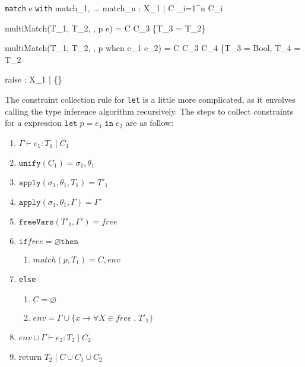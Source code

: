 \documentclass{article}
\begin{document}
    {\Gamma \vdash \texttt{match} \; e \; \texttt{with} \; match_1, ... \; match_n : X_1 \; | \; C \cup \displaystyle \bigcup_{i=1}^{n} C_i}

  {multiMatch(T_1, T_2, \Gamma, p \rightarrow e) = C \cup C_3 \cup \{T_3 = T_2\}}

  {multiMatch(T_1, T_2, \Gamma, p \; \mbox{when} \; e_1 \rightarrow e_2) = C \cup C_3 \cup C_4 \cup \{T_3 = Bool, T_4 = T_2}

    {\Gamma \vdash raise : X_1 \; | \; \{\}}

The constraint collection rule for \texttt{let} is a little more complicated, as it envolves calling the type inference algorithm recursively.
The steps to collect constraints for a expression $\texttt{let} \; p = e_1 \; \texttt{in} \; e_2$ are as follow:

\begin{enumerate}
  \item $\Gamma \vdash e_1 : T_1 \; | \; C_1$

  \item $\texttt{unify}(C_1) = \sigma_1, \theta_1$

  \item $\texttt{apply}(\sigma_1, \theta_1, T_1) = T'_1$

  \item $\texttt{apply}(\sigma_1, \theta_1, \Gamma) = \Gamma'$

  \item $\texttt{freeVars}(T'_1, \Gamma') = free$

  \item $\texttt{if} free = \varnothing \texttt{then}$

  \begin{enumerate}
    \item $match(p, T_1) = C, env$
  \end{enumerate}

  \item \texttt{else}

  \begin{enumerate}
    \item $C = \varnothing$
    \item $env = \Gamma \cup \{x \rightarrow \forall X \in free \; . \; T'_1 \}$
  \end{enumerate}

  \item $env \cup \Gamma \vdash e_2 : T_2 \; | \; C_2$

  \item return $T_2 \; | \; C \cup C_1 \cup C_2$

\end{enumerate}
\end{document}
